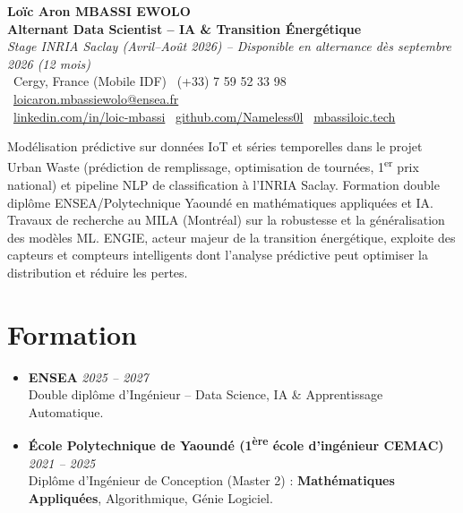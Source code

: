 \documentclass[a4paper,11pt]{article}
\begin{document}
\begin{center}
    {\Large \textbf{Lo\"ic Aron MBASSI EWOLO}} \\ \vspace{4pt}
    \textbf{\large Alternant Data Scientist -- IA \& Transition \'Energ\'etique} \\
    \textit{\small Stage INRIA Saclay (Avril--Ao\^ut 2026) -- Disponible en alternance d\`es septembre 2026 (12 mois)} \\ \vspace{4pt}
    \small
    \faMapMarker\ Cergy, France (Mobile IDF) \quad \faPhone\ (+33) 7 59 52 33 98 \quad
    {\color{primary}\faEnvelope\ \href{mailto:loicaron.mbassiewolo@ensea.fr}{loicaron.mbassiewolo@ensea.fr}} \\ \vspace{2pt}
    {\color{primary}\faLinkedin\ \href{https://www.linkedin.com/in/loic-mbassi/}{linkedin.com/in/loic-mbassi}} \quad
    {\color{primary}\faGithub\ \href{https://github.com/Nameless0l}{github.com/Nameless0l}} \quad
    {\color{primary}\faGlobe\ \href{https://mbassiloic.tech}{mbassiloic.tech}}
\end{center}
\vspace{-6pt}
\noindent\small{Mod\'elisation pr\'edictive sur donn\'ees IoT et s\'eries temporelles dans le projet Urban Waste (pr\'ediction de remplissage, optimisation de tourn\'ees, 1\textsuperscript{er} prix national) et pipeline NLP de classification \`a l'INRIA Saclay. Formation double dipl\^ome ENSEA/Polytechnique Yaound\'e en math\'ematiques appliqu\'ees et IA. Travaux de recherche au MILA (Montr\'eal) sur la robustesse et la g\'en\'eralisation des mod\`eles ML. ENGIE, acteur majeur de la transition \'energ\'etique, exploite des capteurs et compteurs intelligents dont l'analyse pr\'edictive peut optimiser la distribution et r\'eduire les pertes.}

\section{Formation}
\begin{itemize}[leftmargin=*, label=\tiny$\bullet$, nosep]
    \item \textbf{ENSEA} \hfill \textit{2025 -- 2027} \\
    \small{Double dipl\^ome d'Ing\'enieur -- Data Science, IA \& Apprentissage Automatique.}
    \item \textbf{\'Ecole Polytechnique de Yaound\'e (1\textsuperscript{\`ere} \'ecole d'ing\'enieur CEMAC)} \hfill \textit{2021 -- 2025} \\
    \small{Dipl\^ome d'Ing\'enieur de Conception (Master 2) : \textbf{Math\'ematiques Appliqu\'ees}, Algorithmique, G\'enie Logiciel.}
\end{itemize}
\end{document}
